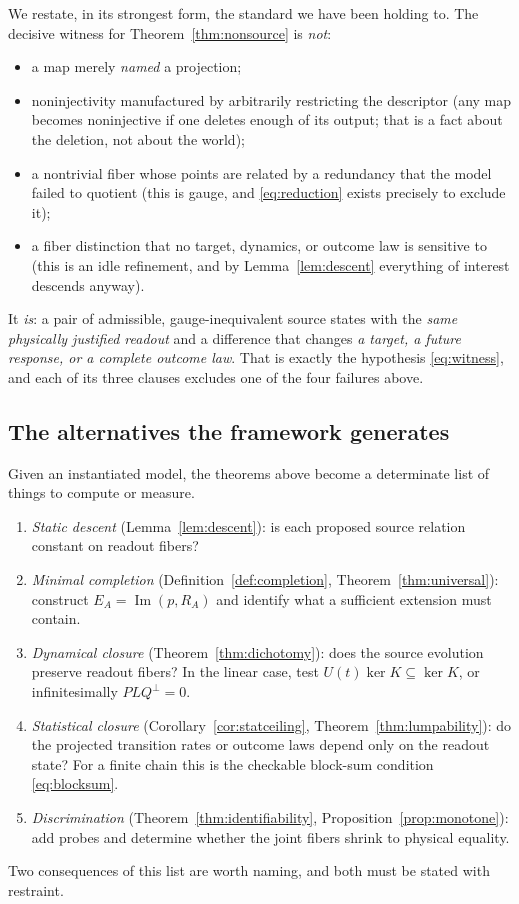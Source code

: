 \documentclass[11pt,reqno]{amsart}
\theoremstyle{plain}
\theoremstyle{definition}
\theoremstyle{remark}
\DeclareMathOperator{\Ima}{Im}
\begin{document}
We restate, in its strongest form, the standard we have been holding to. The decisive witness for Theorem~\ref{thm:nonsource} is \emph{not}:
\begin{itemize}
\item a map merely \emph{named} a projection;
\item noninjectivity manufactured by arbitrarily restricting the descriptor (any map becomes noninjective if one deletes enough of its output; that is a fact about the deletion, not about the world);
\item a nontrivial fiber whose points are related by a redundancy that the model failed to quotient (this is gauge, and \eqref{eq:reduction} exists precisely to exclude it);
\item a fiber distinction that no target, dynamics, or outcome law is sensitive to (this is an idle refinement, and by Lemma~\ref{lem:descent} everything of interest descends anyway).
\end{itemize}
It \emph{is}: a pair of admissible, gauge-inequivalent source states with the \emph{same physically justified readout} and a difference that changes \emph{a target, a future response, or a complete outcome law}. That is exactly the hypothesis \eqref{eq:witness}, and each of its three clauses excludes one of the four failures above.

\subsection{The alternatives the framework generates}

Given an instantiated model, the theorems above become a determinate list of things to compute or measure.
\begin{enumerate}
\item \emph{Static descent} (Lemma~\ref{lem:descent}): is each proposed source relation constant on readout fibers?
\item \emph{Minimal completion} (Definition~\ref{def:completion}, Theorem~\ref{thm:universal}): construct $E_A=\Ima(p,R_A)$ and identify what a sufficient extension must contain.
\item \emph{Dynamical closure} (Theorem~\ref{thm:dichotomy}): does the source evolution preserve readout fibers? In the linear case, test $U(t)\ker K\subseteq\ker K$, or infinitesimally $PLQ^{\!\perp}=0$.
\item \emph{Statistical closure} (Corollary~\ref{cor:statceiling}, Theorem~\ref{thm:lumpability}): do the projected transition rates or outcome laws depend only on the readout state? For a finite chain this is the checkable block-sum condition \eqref{eq:blocksum}.
\item \emph{Discrimination} (Theorem~\ref{thm:identifiability}, Proposition~\ref{prop:monotone}): add probes and determine whether the joint fibers shrink to physical equality.
\end{enumerate}
Two consequences of this list are worth naming, and both must be stated with restraint.
\end{document}
